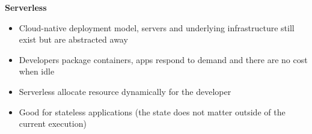 \documentclass[10pt, landscape]{article}
\begin{document}
\begin{multicols}{4}
\textbf{Serverless}
\begin{itemize}
  \item Cloud-native deployment model, servers and underlying infrastructure still exist but are abstracted away
  \item Developers package containers, apps respond to demand and there are no cost when idle
  \item Serverless allocate resource dynamically for the developer
  \item Good for stateless applications (the state does not matter outside of the current execution)
\end{itemize}




\end{multicols}
\end{document}

